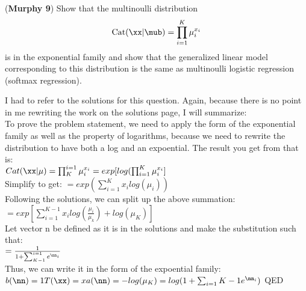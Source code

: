 \documentclass[12pt,letterpaper,fleqn]{hmcpset}
\begin{document}
\begin{problem}[2]
(\textbf{Murphy 9}) Show that the multinoulli distribution
\[
    \text{Cat}(\xx|\mub) = \prod_{i=1}^K \mu_i^{x_i}
\]
is in the exponential family and show that the generalized linear model
corresponding to this distribution is the same as multinoulli logistic
regression (softmax regression).
\end{problem}
\begin{solution}
I had to refer to the solutions for this question. Again, because there is no point in me rewriting the work on the solutions page, I will summarize:\\
To prove the problem statement, we need to apply the form of the exponential family as well as the property of logarithms, because we need to rewrite the distribution to have both a log and an expoential. The result you get from that is: \\$
Cat(\xx|\mu) = \prod _{K}^{i=1} \mu_i^{x_i} = exp[log(\prod_{i=1}^{K} \mu_i^{x_i}] $ \\
Simplify to get: $ = exp(\sum^{K}_{i=1} x_i log(\mu_i)) $\\
Following the solutions, we can split up the above summation:\\
$= exp[ \sum_{i=1}^{K-1} x_i log(\frac{\mu_i}{\mu_k}) + log(\mu_K)] $ \\
Let vector n be defined as it is in the solutions and make the substitution such that: \\$
= \frac{1}{1+\sum_{K-1}^{i=1}e^{\nn_i}} $\\
Thus, we can write it in the form of the expoential family: \\$
b(\nn) = 1 \\
T(\xx) = x \\
a(\nn) = -log(\mu_K) = log(1 + \sum_{i=1}{K-1} e^{\nn_i}) $ QED

\end{solution}
\newpage
\end{document}
